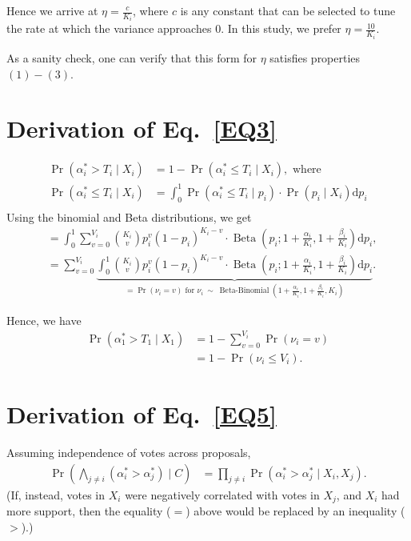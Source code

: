 \documentclass[format=acmsmall, review=true, screen=true, anonymous=true]{acmart}
\begin{document}
Hence we arrive at $\eta = \frac{c}{K_i}$, where $c$ is any constant that can be selected to tune the rate at which the variance approaches $0$.  In this study, we prefer $\eta = \frac{10}{K_i}$.

As a sanity check, one can verify that this form for $\eta$ satisfies properties $(1)-(3)$.

\section{Derivation of Eq.~\eqref{EQ3}}
\begin{align*}
\Pr(\alpha^*_i > T_i \mid X_i) &= 1 - \Pr(\alpha^*_i \leq T_i \mid X_i), \text{ where}\\
\Pr(\alpha^*_i \leq T_i \mid X_i) &= \int_0^1 \Pr(\alpha^*_i \leq T_i \mid p_i)\cdot \Pr(p_i \mid X_i) \mathrm{d}p_i\\
\end{align*}
Using the binomial and Beta distributions, we get
\begin{align*}
&= \int_0^1 \sum\limits_{v=0}^{V_i} {K_i \choose v} p_i^{v} {(1-p_i)}^{K_i-v} \cdot \operatorname{Beta}(p_i; 1+\frac{\alpha_i}{K_i},1+\frac{\beta_i}{K_i}) \mathrm{d}p_i,\\
&= \sum\limits_{v=0}^{V_i} \underbrace{\int_0^1 {K_i \choose v} p_i^{v} {(1-p_i)}^{K_i-v} \cdot \operatorname{Beta}(p_i; 1+\frac{\alpha_i}{K_i},1+\frac{\beta_i}{K_i}) \mathrm{d}p_i}_{= \Pr(\nu_i = v)\text{ for } \nu_i\ \sim\ \operatorname{Beta-Binomial}(1+\frac{\alpha_i}{K_i},1+\frac{\beta_i}{K_i}, K_i)}.
\end{align*}

Hence, we have
\begin{align*}
\Pr(\alpha^*_1 > T_1 \mid X_1) &= 1 - \sum\limits_{v=0}^{V_i} \Pr(\nu_i = v)\\
&= 1 - \Pr(\nu_i \leq V_i).
\end{align*}

\section{Derivation of Eq.~\eqref{EQ5}}
Assuming independence of votes across proposals,
\begin{align*}
\Pr\left(\bigwedge_{j \neq i} (\alpha^*_i > \alpha^*_j) \mid C\right) &=\prod_{j \neq i} \Pr(\alpha^*_i > \alpha^*_j \mid X_i, X_j).
\end{align*}
(If, instead, votes in $X_i$ were negatively correlated with votes in $X_j$, and $X_i$ had more support, then the equality ($=$) above would be replaced by an inequality ($>$).)
\end{document}
